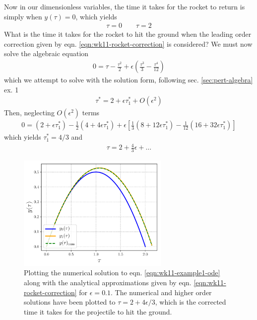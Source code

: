 Now in our dimensionless variables, the time it takes for the rocket to return is simply when $y(\tau)=0$, which yields
\begin{gather*}
	\tau = 0 \qquad \tau = 2
\end{gather*}
What is the time it takes for the rocket to hit the ground when the leading order correction given by eqn. \ref{eqn:wk11-rocket-correction} is considered? We must now solve the algebraic equation 
\begin{align*}
	0 = \tau -\frac{\tau^2}{2} + \epsilon \left(\frac{\tau^3}{3} - \frac{\tau^4}{12}\right)
\end{align*}
which we attempt to solve with the solution form, following sec. \ref{sec:pert-algebra} ex. 1
\begin{gather*}
	\tau^\ast = 2 + \epsilon \tau^\ast_1 + O(\epsilon^2)
\end{gather*}
Then, neglecting $O(\epsilon^2)$ terms
\begin{gather*}
	0 = (2+\epsilon \tau_1^\ast) - \frac{1}{2}(4+ 4\epsilon \tau_1^\ast) + \epsilon \left[\frac{1}{3}(8+12\epsilon \tau_1^\ast)-\frac{1}{12}(16+32 \epsilon \tau_1^\ast)\right]
\end{gather*}
which yields $\tau_1^\ast = 4/3$ and
\begin{gather*}
	\tau = 2 + \frac{4}{3}\epsilon + \dots 
\end{gather*}
\begin{figure}[!h]
	\centering
	\includegraphics[width=0.65\textwidth]{./plots/pdf/strogatz-wk11.pdf}
	\caption{Plotting the numerical solution to eqn. \ref{eqn:wk11-example1-ode} along with the analytical approximations given by eqn. \ref{eqn:wk11-rocket-correction} for $\epsilon=0.1$. The numerical and higher order solutions have been plotted to $\tau = 2 + 4\epsilon/3$, which is the corrected time it takes for the projectile to hit the ground.}
	\label{fig:strogatz-wk11}
\end{figure} \\

